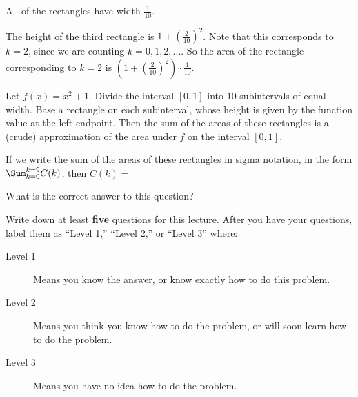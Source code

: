 \documentclass{ximera}
\begin{document}
\begin{question}
	\begin{hint}
		All of the rectangles have width $\frac{1}{10}$.
	\end{hint}
	\begin{hint}
		The height of the third rectangle is $1+(\frac{2}{10})^2$.  Note that this corresponds to $k=2$, since we are counting $k=0,1,2,...$.  So the area of the rectangle corresponding to $k=2$ is $(1+(\frac{2}{10})^2) \cdot \frac{1}{10}$.
	\end{hint}
	Let $f(x) = x^2+1$.  Divide the interval $[0,1]$ into $10$ subintervals of equal width.  Base a rectangle on each subinterval, whose height is given by the function value at the left endpoint.  Then the sum of the areas of these rectangles is a (crude) approximation of the area under $f$ on the interval $[0,1]$.
	
	
	If we write the sum of the areas of these rectangles in sigma notation, in the form $\Sum_{k=0}^{k=9} C(k)$, then $C(k) = $
\end{question}

\begin{question}
  What is the correct answer to this question?

  
    \begin{multipleChoice}
    \end{multipleChoice}  
  
\end{question}

Write down at least \textbf{five} questions for this lecture. After
you have your questions, label them as ``Level 1,'' ``Level 2,'' or ``Level 3'' where:
\begin{description}
\item[Level 1] Means you know the answer, or know exactly how to do this problem.
\item[Level 2] Means you think you know how to do the problem, or will soon learn how to do the problem.
\item[Level 3] Means you have no idea how to do the problem. 
\end{description}
\begin{question}
  \begin{freeResponse}
  \end{freeResponse}
\end{question}
\end{document}

